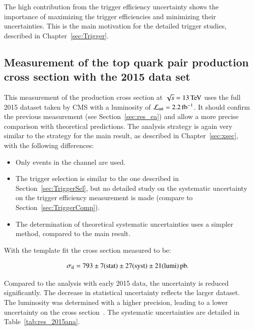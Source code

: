 The high contribution from the trigger efficiency uncertainty shows the importance of maximizing the trigger efficiencies and minimizing their uncertainties.
This is the main motivation for the detailed trigger studies, described in Chapter~\ref{sec:Trigger}. 

\subsection{Measurement of the top quark pair production cross section with the 2015 data set}
\label{sec:res_2015}

This measurement of the \ttbar production cross section at $\sqrt{s}=13\,\text{Te\hspace{-.08em}V}$ uses the full 2015 dataset taken by CMS with a luminosity of $\mathcal{L}_\mathrm{int}= 2.2 \mbox{\ensuremath{\,\text{fb}^\text{$-$1}}}$.
It should confirm the previous measurement (see Section~\ref{sec:res_ea}) and allow a more precise comparison with theoretical predictions.
The analysis strategy is again very similar to the strategy for the main result, as described in Chapter~\ref{sec:xsec}, with the following differences:

\begin{itemize}
\item Only events in the \emu channel are used.
\item The trigger selection is similar to the one described in Section~\ref{sec:TriggerSel}, but no detailed study on the systematic uncertainty on the trigger efficiency measurement is made (compare to Section~\ref{sec:TriggerComp}).
\item The determination of theoretical systematic uncertainties uses a simpler method, compared to the main result.
\end{itemize}

With the template fit the \ttbar cross section measured to be:

\begin{equation}
\sigma_{\mathrm{t}\bar{\mathrm{t}}} = 793 \pm  7 ({\rm stat}) \pm 27 ({\rm syst}) \pm 21 ({\rm lumi}) \mbox{\ensuremath{\,\text{pb}}} .
\end{equation}

Compared to the analysis with early 2015 data, the uncertainty is reduced significantly. The decrease in statistical uncertainty reflects the larger dataset. The luminosity was determined with a higher precision, leading to a lower
uncertainty on the \ttbar cross section~\cite{CMS-PAS-LUM-15-001}. The systematic uncertainties are detailed in Table~\ref{tab:res_2015ana}.

